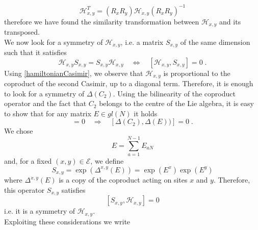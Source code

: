 \documentclass[10pt]{article}
\numberwithin{equation}{section}
\numberwithin{equation}{subsection}
\newcommand{\dt}{\;.}
\begin{document}
\begin{equation}\label{transpositionPropertyH}
    \mathcal{H}_{x,y}^{T}=\left(R_{x}R_{y}\right)\mathcal{H}_{x,y}\left(R_{x}R_{y}\right)^{-1}
\end{equation}
therefore we have found the similarity transformation between $\mathcal{H}_{x,y}$ and its transposed. \\
We now look for a symmetry of $\mathcal{H}_{x,y}$, i.e. a matrix $S_{x,y}$ of the same dimension such that it satisfies 
\begin{equation}
	\mathcal{H}_{x,y}S_{x,y}=S_{x,y}\mathcal{H}_{x,y}\quad \Leftrightarrow \quad [\mathcal{H}_{x,y},S_{x,y}]=0\dt
\end{equation}
Using \eqref{hamiltonianCasimir}, we observe that $\mathcal{H}_{x,y}$ is proportional to the coproduct of the second Casimir, up to a diagonal term. Therefore, it is enough to look for a symmetry of $\Delta (C_{2})$. Using the bilinearity of the coproduct operator and the fact that $C_{2}$ belongs to the centre of the Lie algebra, it is easy to show that for any matrix $E\in gl(N)$ it holds
\begin{equation}
	[C_{2},E]=0\quad \Rightarrow\quad \left[\Delta (C_{2}),\Delta(E)) \right]=0\dt
\end{equation}
We chose 
\begin{equation}
	E=\sum_{a=1}^{N-1}E_{aN}
\end{equation}
and, for a fixed $(x,y)\in \mathcal{E}$, we define
\begin{equation}
	S_{x,y}=\exp{(\Delta^{x,y}(E))}=\exp{(E^{x})}\exp{(E^{y})}
\end{equation}
where $\Delta^{x,y}(E)$ is a copy of the coproduct acting on sites $x$ and $y$. Therefore, this operator $S_{x,y}$ satisfies
\begin{equation}\label{symmetryH}
	\left[S_{x,y},\mathcal{H}_{x,y}\right]=0
\end{equation}
i.e. it is a symmetry of $\mathcal{H}_{x,y}$. \\ Exploiting these considerations we write
\end{document}
